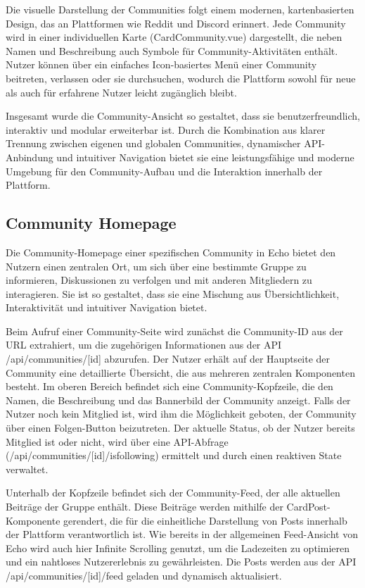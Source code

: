 \documentclass[a4paper,12pt]{article}
\begin{document}
Die visuelle Darstellung der Communities folgt einem modernen, kartenbasierten
Design, das an Plattformen wie Reddit und Discord erinnert. Jede Community wird
in einer individuellen Karte (CardCommunity.vue) dargestellt, die neben Namen
und Beschreibung auch Symbole für Community-Aktivitäten enthält. Nutzer können
über ein einfaches Icon-basiertes Menü einer Community beitreten, verlassen
oder sie durchsuchen, wodurch die Plattform sowohl für neue als auch für
erfahrene Nutzer leicht zugänglich bleibt.

Insgesamt wurde die Community-Ansicht so gestaltet, dass sie
benutzerfreundlich, interaktiv und modular erweiterbar ist. Durch die
Kombination aus klarer Trennung zwischen eigenen und globalen Communities,
dynamischer API-Anbindung und intuitiver Navigation bietet sie eine
leistungsfähige und moderne Umgebung für den Community-Aufbau und die
Interaktion innerhalb der Plattform.

\subsection{Community Homepage}
Die Community-Homepage einer spezifischen Community in Echo bietet den Nutzern
einen zentralen Ort, um sich über eine bestimmte Gruppe zu informieren,
Diskussionen zu verfolgen und mit anderen Mitgliedern zu interagieren. Sie ist
so gestaltet, dass sie eine Mischung aus Übersichtlichkeit, Interaktivität und
intuitiver Navigation bietet.

Beim Aufruf einer Community-Seite wird zunächst die Community-ID aus der URL
extrahiert, um die zugehörigen Informationen aus der API /api/communities/[id]
abzurufen. Der Nutzer erhält auf der Hauptseite der Community eine detaillierte
Übersicht, die aus mehreren zentralen Komponenten besteht. Im oberen Bereich
befindet sich eine Community-Kopfzeile, die den Namen, die Beschreibung und das
Bannerbild der Community anzeigt. Falls der Nutzer noch kein Mitglied ist, wird
ihm die Möglichkeit geboten, der Community über einen Folgen-Button
beizutreten. Der aktuelle Status, ob der Nutzer bereits Mitglied ist oder
nicht, wird über eine API-Abfrage (/api/communities/[id]/isfollowing) ermittelt
und durch einen reaktiven State verwaltet.

Unterhalb der Kopfzeile befindet sich der Community-Feed, der alle aktuellen
Beiträge der Gruppe enthält. Diese Beiträge werden mithilfe der
CardPost-Komponente gerendert, die für die einheitliche Darstellung von Posts
innerhalb der Plattform verantwortlich ist. Wie bereits in der allgemeinen
Feed-Ansicht von Echo wird auch hier Infinite Scrolling genutzt, um die
Ladezeiten zu optimieren und ein nahtloses Nutzererlebnis zu gewährleisten. Die
Posts werden aus der API /api/communities/[id]/feed geladen und dynamisch
aktualisiert.
\end{document}
